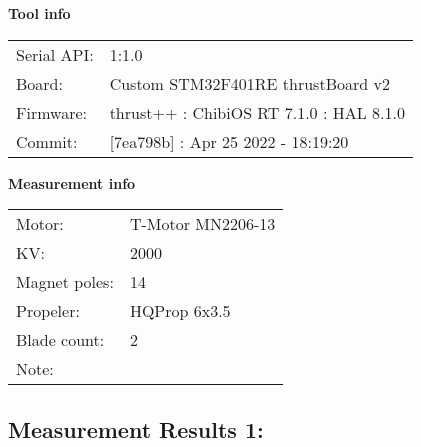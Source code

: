 \documentclass[10pt]{article}
\begin{document}
\noindent
{\large \bf Tool info}
\vspace{3mm}

\noindent
\begin{tabular}{ll}
Serial API:  & 1:1.0\\ 
Board:       & Custom STM32F401RE thrustBoard v2\\ 
Firmware:    & thrust++ : ChibiOS RT 7.1.0 : HAL 8.1.0\\ 
Commit:      & [7ea798b] : Apr 25 2022 - 18:19:20
\end{tabular}
\vspace{3mm}

\noindent
{\large \bf Measurement info}
\vspace{3mm}

\noindent
\begin{tabular}{ll}
Motor:        & T-Motor MN2206-13\\ 
KV:           & 2000\\ 
Magnet poles: & 14\\ 
Propeler:     & HQProp 6x3.5\\ 
Blade count:  & 2\\ 
Note:         & 
\end{tabular}

\vspace{3mm}


\subsection*{\large \bf Measurement Results 1:}
\end{document}
